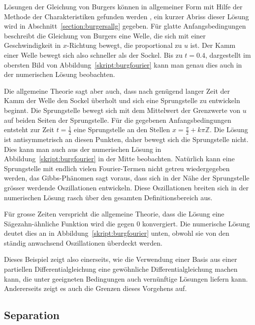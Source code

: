 Lösungen der Gleichung von Burgers können in allgemeiner Form mit
Hilfe der Methode der Charakteristiken gefunden werden \cite{skript:pde},
ein kurzer Abriss dieser Lösung wird in Abschnitt~\ref{section:burgersallg}
gegeben.
Für glatte Anfangsbedingungen beschreibt die Gleichung von Burgers eine
Welle, die sich mit einer Geschwindigkeit in $x$-Richtung bewegt, die
proportional zu $u$ ist.
Der Kamm einer Welle bewegt sich also schneller als der Sockel.
Bis zu $t=0.4$, dargestellt im obersten Bild von
Abbildung~\ref{skript:burgfourier} kann man genau dies auch in der
numerischen Lösung beobachten.

Die allgemeine Theorie sagt aber auch, dass nach genügend langer
Zeit der Kamm der Welle den Sockel überholt und sich eine Sprungstelle
zu entwickeln beginnt.
Die Sprungstelle bewegt sich mit dem Mittelwert der Grenzwerte von $u$
auf beiden Seiten der Sprungstelle.
Für die gegebenen Anfangsbedingungen entsteht zur Zeit $t=\frac12$
eine Sprungstelle an den Stellen $x=\frac{\pi}2+k\pi\mathbb Z$.
Die Lösung ist antisymmetrisch an diesen Punkten, daher bewegt sich
die Sprungstelle nicht.
Dies kann man auch aus der numerischen Lösung in
Abbildung~\ref{skript:burgfourier}
in der Mitte beobachten.
Natürlich kann eine Sprungstelle mit endlich vielen Fourier-Termen
nicht getreu wiedergegeben werden, das Gibbs-Phänomen sagt voraus,
dass sich in der Nähe der Sprungstelle grösser werdende Oszillationen
entwickeln.
Diese Oszillationen breiten sich in der numerischen Lösung rasch
über den gesamten Definitionsbereich aus.

Für grosse Zeiten verspricht die allgemeine Theorie, dass die Lösung
eine Sägezahn-ähnliche Funktion wird die gegen $0$ konvergiert.
Die numerische Lösung deutet dies an in Abbildung~\ref{skript:burgfourier}
unten, obwohl sie von den ständig anwachsend Oszillationen überdeckt werden.

Dieses Beispiel zeigt also einerseits, wie die Verwendung einer Basis
aus einer partiellen Differentialgleichung
eine gewöhnliche Differentialgleichung machen kann, die unter geeigneten
Bedingungen auch vernünftige Lösungen liefern kann.
Andererseits zeigt es auch die Grenzen dieses Vorgehens auf.

\subsection{Separation}
%
